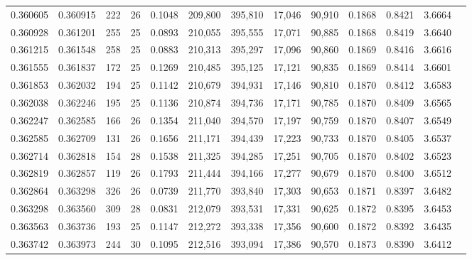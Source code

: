 \begin{tabular}{rrrrrrrrrrrrr}
0.360605 & 0.360915 &   222 &  26 &                                     0.1048 & 209,800 & 395,810 &  17,046 &  90,910 & 0.1868 & 0.8421 & 3.6664 \\
0.360928 & 0.361201 &   255 &  25 &                                     0.0893 & 210,055 & 395,555 &  17,071 &  90,885 & 0.1868 & 0.8419 & 3.6640 \\
0.361215 & 0.361548 &   258 &  25 &                                     0.0883 & 210,313 & 395,297 &  17,096 &  90,860 & 0.1869 & 0.8416 & 3.6616 \\
0.361555 & 0.361837 &   172 &  25 &                                     0.1269 & 210,485 & 395,125 &  17,121 &  90,835 & 0.1869 & 0.8414 & 3.6601 \\
0.361853 & 0.362032 &   194 &  25 &                                     0.1142 & 210,679 & 394,931 &  17,146 &  90,810 & 0.1870 & 0.8412 & 3.6583 \\
0.362038 & 0.362246 &   195 &  25 &                                     0.1136 & 210,874 & 394,736 &  17,171 &  90,785 & 0.1870 & 0.8409 & 3.6565 \\
0.362247 & 0.362585 &   166 &  26 &                                     0.1354 & 211,040 & 394,570 &  17,197 &  90,759 & 0.1870 & 0.8407 & 3.6549 \\
0.362585 & 0.362709 &   131 &  26 &                                     0.1656 & 211,171 & 394,439 &  17,223 &  90,733 & 0.1870 & 0.8405 & 3.6537 \\
0.362714 & 0.362818 &   154 &  28 &                                     0.1538 & 211,325 & 394,285 &  17,251 &  90,705 & 0.1870 & 0.8402 & 3.6523 \\
0.362819 & 0.362857 &   119 &  26 &                                     0.1793 & 211,444 & 394,166 &  17,277 &  90,679 & 0.1870 & 0.8400 & 3.6512 \\
0.362864 & 0.363298 &   326 &  26 &                                     0.0739 & 211,770 & 393,840 &  17,303 &  90,653 & 0.1871 & 0.8397 & 3.6482 \\
0.363298 & 0.363560 &   309 &  28 &                                     0.0831 & 212,079 & 393,531 &  17,331 &  90,625 & 0.1872 & 0.8395 & 3.6453 \\
0.363563 & 0.363736 &   193 &  25 &                                     0.1147 & 212,272 & 393,338 &  17,356 &  90,600 & 0.1872 & 0.8392 & 3.6435 \\
0.363742 & 0.363973 &   244 &  30 &                                     0.1095 & 212,516 & 393,094 &  17,386 &  90,570 & 0.1873 & 0.8390 & 3.6412 \\

\end{tabular}
